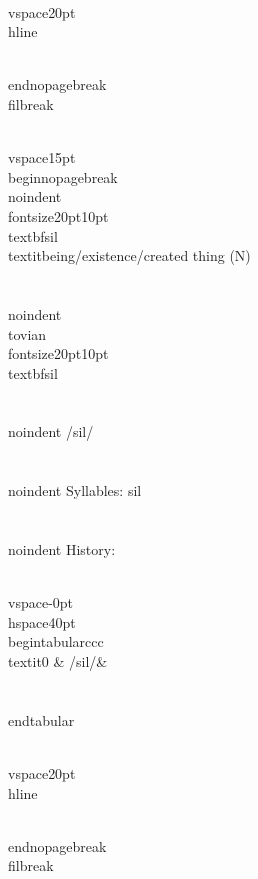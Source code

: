 \\vspace{20pt}\\hline

\\end{nopagebreak}
\\filbreak



\\vspace{15pt}
\\begin{nopagebreak}
\\noindent{\\fontsize{20pt}{10pt}\\textbf{sil} } \\textit{being/existence/created thing} (N)\\\\
\\noindent {\\tovian \\fontsize{20pt}{10pt} \\textbf{sil} }\\\\
\\noindent /s{\textprimstress}il/\\\\
\\noindent Syllables: sil\\\\


\\noindent History:

\\vspace{-0pt}
\\hspace{40pt}
\\begin{tabular}{ccc}
\\textit{0} & /sil/& \\\\
\\end{tabular}

\\vspace{20pt}\\hline

\\end{nopagebreak}
\\filbreak



